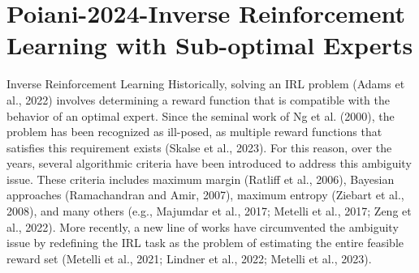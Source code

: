 \documentclass{article}
\begin{document}



\section{Poiani-2024-Inverse Reinforcement Learning with Sub-optimal Experts}

Inverse Reinforcement Learning Historically,
solving an IRL problem (Adams et al., 2022) involves
determining a reward function that is compatible with
the behavior of an optimal expert. Since the seminal
work of Ng et al. (2000), the problem has been recognized
as ill-posed, as multiple reward functions that
satisfies this requirement exists (Skalse et al., 2023).
For this reason, over the years, several algorithmic
criteria have been introduced to address this ambiguity
issue. These criteria includes maximum margin
(Ratliff et al., 2006), Bayesian approaches (Ramachandran
and Amir, 2007), maximum entropy (Ziebart
et al., 2008), and many others (e.g., Majumdar et al.,
2017; Metelli et al., 2017; Zeng et al., 2022). More
recently, a new line of works have circumvented the
ambiguity issue by redefining the IRL task as the problem
of estimating the entire feasible reward set (Metelli
et al., 2021; Lindner et al., 2022; Metelli et al., 2023).
\end{document}
